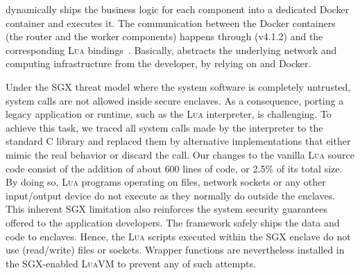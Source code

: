 \SYS{} dynamically ships the business logic for each component into a dedicated Docker container and executes it.
The communication between the Docker containers (the router and the worker components) happens through \zmq (v4.1.2) and the corresponding \textsc{Lua} bindings~\cite{github:lzmq}.
Basically, \SYS{} abstracts the underlying network and computing infrastructure from the developer, by relying on \zmq and Docker.

Under the SGX threat model where the system software is completely untrusted, system calls are not allowed inside secure enclaves.
As a consequence, porting a legacy application or runtime, such as the \textsc{Lua} interpreter, is challenging.
To achieve this task, we traced all system calls made by the interpreter to the standard C library and replaced them by alternative implementations that either mimic the real behavior or discard the call.
Our changes to the vanilla \textsc{Lua} source code consist of the addition of about $600$ lines of code, or 2.5\% of its total size.
By doing so, \textsc{Lua} programs operating on files, network sockets or any other input/output device do not execute as they normally do outside the enclaves. %
This inherent SGX limitation also reinforces the system security guarantees offered to the application developers.
The \SYS{} framework safely ships the data and code to enclaves.
Hence, the \textsc{Lua} scripts executed within the SGX enclave do not use (read/write) files or sockets.
Wrapper functions are nevertheless installed in the SGX-enabled \textsc{LuaVM} to prevent any of such attempts.


